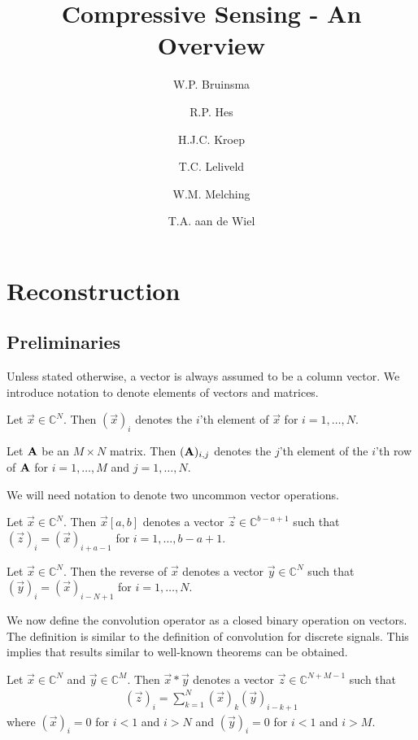 \documentclass[a4paper, openany, oneside]{memoir}
\title{Compressive Sensing - An Overview}
\author{W.P. Bruinsma \and R.P. Hes \and H.J.C. Kroep \and T.C. Leliveld \and W.M. Melching \and T.A. aan de Wiel}
\begin{document}
\chapter{Reconstruction}

\section{Preliminaries}
Unless stated otherwise, a vector is always assumed to be a column vector. We introduce notation to denote elements of vectors and matrices.

\begin{blockDefinition}
    Let $\vec{x} \in \mathbb{C}^N$. Then $(\vec{x})_i$ denotes the $i$'th element of $\vec{x}$ for $i = 1,\ldots,N$.
\end{blockDefinition}

\begin{blockDefinition}
    Let $\boldsymbol{\mathbf{A}}$ be an $M \times N$ matrix. Then $(\boldsymbol{\mathbf{A}})_{i,j}$ denotes the $j$'th element of the $i$'th row of $\boldsymbol{\mathbf{A}}$ for $i = 1,\ldots,M$ and $j=1,\ldots,N$.
\end{blockDefinition}

We will need notation to denote two uncommon vector operations.

\begin{blockDefinition}[Subvector]
    Let $\vec{x} \in \mathbb{C}^N$. Then $\vec{x}[a,b]$ denotes a vector $\vec{z} \in \mathbb{C}^{b-a+1}$ such that $(\vec{z})_i = (\vec{x})_{i+a-1}$ for $i = 1,\ldots,b-a+1$.
\end{blockDefinition}

\begin{blockDefinition}
    Let $\vec{x} \in \mathbb{C}^N$. Then the reverse of $\vec{x}$ denotes a vector $\vec{y} \in \mathbb{C}^N$ such that $(\vec{y})_i = (\vec{x})_{i-N+1}$ for $i = 1,\ldots,N$.
\end{blockDefinition}

We now define the convolution operator as a closed binary operation on vectors. The definition is similar to the definition of convolution for discrete signals. This implies that results similar to well-known theorems can be obtained.

\begin{blockDefinition}[Convolution]
    Let $\vec{x} \in \mathbb{C}^N$ and $\vec{y} \in \mathbb{C}^M$. Then $\vec{x} \ast \vec{y}$ denotes a vector $\vec{z} \in \mathbb{C}^{N+M-1}$ such that
    \begin{align*}
        (\vec{z})_i = \sum_{k=1}^{N} (\vec{x})_k (\vec{y})_{i-k+1}
    \end{align*}
    where $(\vec{x})_i=0$ for $i < 1$ and $i > N$ and $(\vec{y})_i=0$ for $i < 1$ and $i > M$.
\end{blockDefinition}
\end{document}
